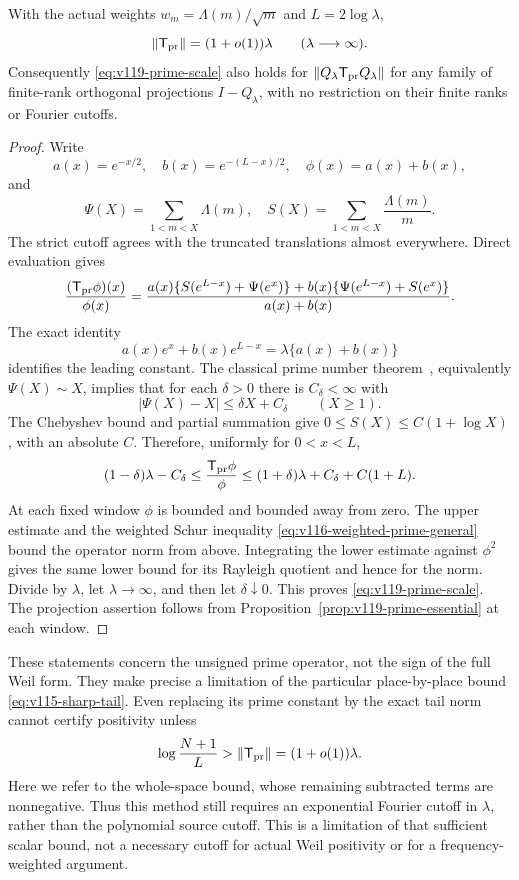 \begin{proposition}
\label{prop:v119-prime-scale}
With the actual weights $w_m=\Lambda(m)/\sqrt m$ and $L=2\log\lambda$,
\begin{equation}\label{eq:v119-prime-scale}
 \|\mathsf T_{\rm pr}\|=(1+o(1))\lambda
       \qquad(\lambda\longrightarrow\infty).
\end{equation}
Consequently \eqref{eq:v119-prime-scale} also holds for
$\|Q_\lambda\mathsf T_{\rm pr}Q_\lambda\|$ for any family of
finite-rank orthogonal projections $I-Q_\lambda$, with no restriction on their
finite ranks or Fourier cutoffs.
\end{proposition}
\begin{proof}
Write
\[
 a(x)=e^{-x/2},\quad b(x)=e^{-(L-x)/2},\quad\phi(x)=a(x)+b(x),
\]
and
\[
 \Psi(X)=\sum_{1<m<X}\Lambda(m),\quad
 S(X)=\sum_{1<m<X}\frac{\Lambda(m)}m.
\]
The strict cutoff agrees with the truncated translations almost
everywhere.  Direct evaluation gives
\begin{equation}\label{eq:v119-prime-weight-ratio}
 \frac{(\mathsf T_{\rm pr}\phi)(x)}{\phi(x)}
 =\frac{a(x)\{S(e^{L-x})+\Psi(e^x)\}
       +b(x)\{\Psi(e^{L-x})+S(e^x)\}}{a(x)+b(x)}.
\end{equation}
The exact identity
\[
 a(x)e^x+b(x)e^{L-x}=\lambda\{a(x)+b(x)\}
\]
identifies the leading constant.  The classical prime number
theorem~\cite{NISTPrimeAsymptotics}, equivalently $\Psi(X)\sim X$,
implies that for each $\delta>0$ there is $C_\delta<\infty$ with
\[
 |\Psi(X)-X|\le\delta X+C_\delta\qquad(X\ge1).
\]
The Chebyshev bound and partial summation give
$0\le S(X)\le C(1+\log X)$, with an absolute $C$.
Therefore, uniformly for $0<x<L$,
\[
 (1-\delta)\lambda-C_\delta
 \le\frac{\mathsf T_{\rm pr}\phi}{\phi}
 \le(1+\delta)\lambda+C_\delta+C(1+L).
\]
At each fixed window $\phi$ is bounded and bounded away from zero.
The upper estimate and the weighted Schur inequality
\eqref{eq:v116-weighted-prime-general} bound the operator norm from
above.  Integrating the lower estimate against $\phi^2$ gives the
same lower bound for its Rayleigh quotient and hence for the norm.
Divide by $\lambda$, let $\lambda\to\infty$, and then let
$\delta\downarrow0$. This proves \eqref{eq:v119-prime-scale}.
The projection assertion follows from
Proposition~\ref{prop:v119-prime-essential} at each window.
\end{proof}

These statements concern the unsigned prime operator, not the sign of
the full Weil form.  They make precise a limitation of the particular
place-by-place bound \eqref{eq:v115-sharp-tail}. Even replacing its
prime constant by the exact tail norm cannot certify positivity unless
\begin{equation}\label{eq:v119-unsigned-cutoff}
 \log\frac{N+1}{L}>\|\mathsf T_{\rm pr}\|
       =(1+o(1))\lambda.
\end{equation}
Here we refer to the whole-space bound, whose remaining subtracted
terms are nonnegative. Thus this method still requires an exponential
Fourier cutoff in $\lambda$, rather than the polynomial source cutoff.
This is a limitation of that sufficient scalar bound, not a necessary
cutoff for actual Weil positivity or for a frequency-weighted argument.

